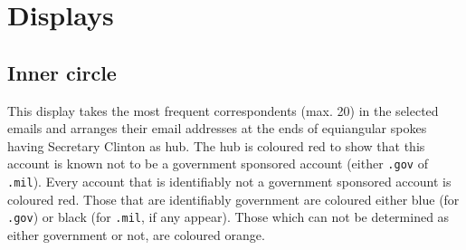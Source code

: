 \documentclass[journal]{vgtc}                %
\begin{document}
\section{Displays}
\label{sect:Displays}
\subsection{Inner circle}
\label{sect:Displays:circle} 
This display takes the most frequent correspondents (max. 20) in the selected emails and arranges their email addresses  at the ends of  equiangular spokes having Secretary Clinton as hub.  The hub is coloured red to show that this account is known not to be a government sponsored account (either \texttt{.gov} of \texttt{.mil}).  Every account that is identifiably not a government sponsored account is coloured red.  Those that are identifiably government are coloured either blue (for \texttt{.gov}) or black (for \texttt{.mil}, if any appear).  Those which can not be determined as either government or not, are coloured orange.
\end{document}
